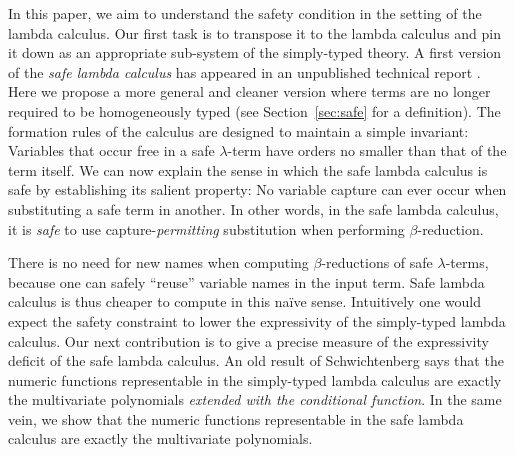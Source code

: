 \documentclass{llncs}
\begin{document}
In this paper, we aim to understand the safety condition in the
setting of the lambda calculus. Our first task is to transpose it to
the lambda calculus and pin it down as an appropriate sub-system of
the simply-typed theory. A first version of the \emph{safe lambda
  calculus} has appeared in an unpublished technical report
\cite{safety-mirlong2004}. Here we propose a more general and cleaner
version where terms are no longer required to be homogeneously typed
(see Section~\ref{sec:safe} for a definition). The formation rules of
the calculus are designed to maintain a simple invariant: Variables
that occur free in a safe $\lambda$-term have orders no smaller than
that of the term itself.  We can now explain the sense in which the
safe lambda calculus is safe by establishing its salient property: No
variable capture can ever occur when substituting a safe term in
another. In other words, in the safe lambda calculus, it is
\emph{safe} to use capture-\emph{permitting} substitution when
performing $\beta$-reduction.


There is no need for new names when computing $\beta$-reductions of
safe $\lambda$-terms, because one can safely ``reuse'' variable names
in the input term. Safe lambda calculus is thus cheaper to compute in
this na\"ive sense. Intuitively one would expect the safety constraint
to lower the expressivity of the simply-typed lambda calculus. Our
next contribution is to give a precise measure of the expressivity
deficit of the safe lambda calculus. An old result of Schwichtenberg
\cite{citeulike:622637} says that the numeric functions representable
in the simply-typed lambda calculus are exactly the multivariate
polynomials \emph{extended with the conditional function}.  In the
same vein, we show that the numeric functions representable in the
safe lambda calculus are exactly the multivariate polynomials.
\end{document}
